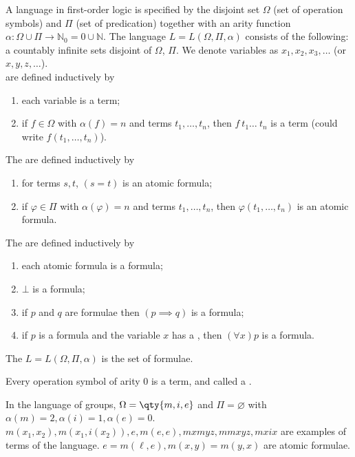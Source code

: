 A language in first-order logic is specified by the disjoint set $\Omega$ (set of operation symbols) and $\Pi$ (set of predication) together with an arity function $\alpha \colon \Omega \cup \Pi \to \mathbb N_0 = \qty{0} \cup \mathbb{N}$.
The language $L = L(\Omega, \Pi, \alpha)$ consists of the following:
 a countably infinite sets disjoint of $\Omega$, $\Pi$.
We denote variables as $x_1, x_2, x_3, \dots$ (or $x, y, z, \dots$). \\
 are defined inductively by
\begin{enumerate}
    \item each variable is a term;
    \item if $f \in \Omega$ with $\alpha(f) = n$ and terms $t_1, \dots, t_n$, then $f\ t_1\dots\ t_n$ is a term (could write $f(t_1, \dots, t_n)$).
\end{enumerate}
The  are defined inductively by
\begin{enumerate}
    \item for terms $s, t$, $(s = t)$ is an atomic formula;
    \item if $\varphi \in \Pi$ with $\alpha(\varphi) = n$ and terms $t_1, \dots, t_n$, then $\varphi(t_1, \dots, t_n)$ is an atomic formula.
\end{enumerate}
The  are defined inductively by
\begin{enumerate}
    \item each atomic formula is a formula;
    \item $\bot$ is a formula;
    \item if $p$ and $q$ are formulae then $(p \implies q)$ is a formula;
    \item if $p$ is a formula and the variable $x$ has a , then $(\forall x) p$ is a formula.
\end{enumerate}

The  $L = L(\Omega, \Pi, \alpha)$ is the set of formulae.

\begin{definition}[Constant]
    Every operation symbol of arity $0$ is a term, and called a .
\end{definition}

\begin{example}
    In the language of groups, $\Omega = \qty{m, i, e}$ and $\Pi = \varnothing$ with $\alpha(m) = 2, \alpha(i) = 1, \alpha(e) = 0$.
    $m(x_1, x_2), m(x_1, i(x_2)), e, m(e, e), mxmyz, mmxyz, mxix$ are examples of terms of the language.
    $e = m(\ell, e), m(x,y) = m(y,x)$ are atomic formulae.
\end{example}


